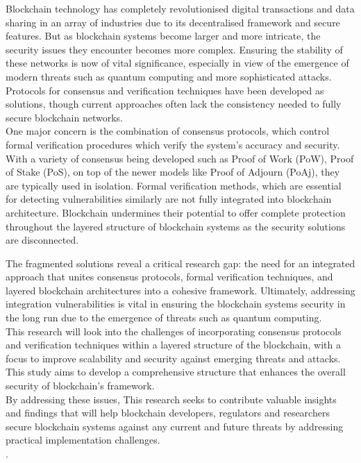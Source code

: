 \documentclass[a4paper, 12pt]{article}
\begin{document}
Blockchain technology has completely revolutionised digital transactions and data sharing in an array of industries due to its decentralised framework and secure features. But as blockchain systems become larger and more intricate, the security issues they encounter becomes more complex. Ensuring the stability of these networks is now of vital significance, especially in view of the emergence of modern threats such as quantum computing and more sophisticated attacks. Protocols for consensus and verification techniques have been developed as solutions, though current approaches often lack the consistency needed to fully secure blockchain networks.\\

One major concern is the combination of consensus protocols, which control formal verification procedures which verify the system's accuracy and security. With a variety of consensus being developed such as Proof of Work (PoW), Proof of Stake (PoS), on top of the newer models like Proof of Adjourn (PoAj), they are typically used in isolation. Formal verification methods, which are essential for detecting vulnerabilities similarly are not fully integrated into blockchain architecture. Blockchain undermines their potential to offer complete protection throughout the layered structure of blockchain systems as the security solutions are disconnected.

The fragmented solutions reveal a critical research gap: the need for an integrated approach that unites consensus protocols, formal verification techniques, and layered blockchain architectures into a cohesive framework. Ultimately, addressing integration vulnerabilities is vital in ensuring the blockchain systems security in the long run due to the emergence of threats such as quantum computing. \\

This research will look into the challenges of incorporating consensus protocols and verification techniques within a layered structure of the blockchain, with a focus to improve scalability and security against emerging threats and attacks. This study aims to develop a comprehensive structure that enhances the overall security of blockchain's framework. \\

By addressing these issues, This research seeks to contribute valuable insights and findings that will help blockchain developers, regulators and researchers secure blockchain systems against any current and future threats by addressing practical implementation challenges.
 \\
 \cite{Hossain}.
\end{document}
